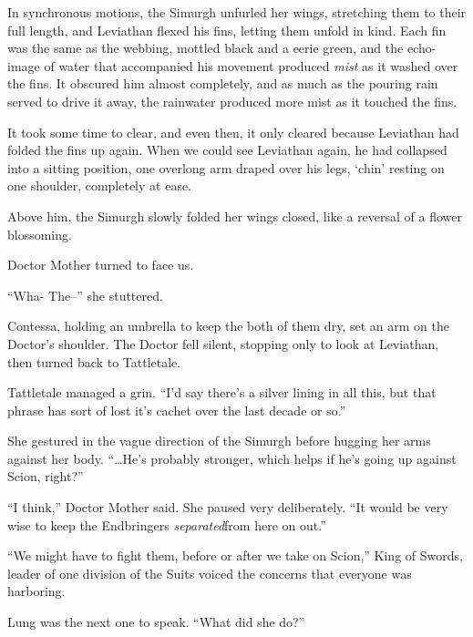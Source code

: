 In synchronous motions, the Simurgh unfurled her wings, stretching them to their full length, and Leviathan flexed his fins, letting them unfold in kind.  Each fin was the same as the webbing, mottled black and a eerie green, and the echo-image of water that accompanied his movement produced \emph{mist} as it washed over the fins.  It obscured him almost completely, and as much as the pouring rain served to drive it away, the rainwater produced more mist as it touched the fins.



It took some time to clear, and even then, it only cleared because Leviathan had folded the fins up again.  When we could see Leviathan again, he had collapsed into a sitting position, one overlong arm draped over his legs, `chin' resting on one shoulder, completely at ease.



Above him, the Simurgh slowly folded her wings closed, like a reversal of a flower blossoming.



Doctor Mother turned to face us.



``Wha-  The--'' she stuttered.



Contessa, holding an umbrella to keep the both of them dry, set an arm on the Doctor's shoulder.  The Doctor fell silent, stopping only to look at Leviathan, then turned back to Tattletale.



Tattletale managed a grin.  ``I'd say there's a silver lining in all this, but that phrase has sort of lost it's cachet over the last decade or so.''



She gestured in the vague direction of the Simurgh before hugging her arms against her body.  ``\ldots{}He's probably stronger, which helps if he's going up against Scion, right?''



``I think,'' Doctor Mother said.  She paused very deliberately.  ``It would be very wise to keep the Endbringers \emph{separated}from here on out.''



``We might have to fight them, before or after we take on Scion,'' King of Swords, leader of one division of the Suits voiced the concerns that everyone was harboring.



Lung was the next one to speak.  ``What did she do?''



